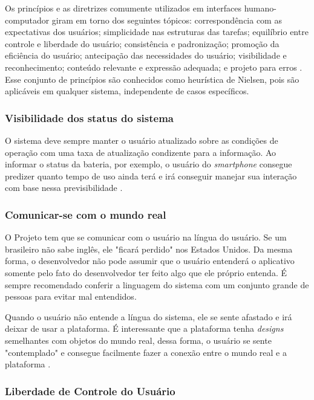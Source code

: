 Os princípios e as diretrizes comumente utilizados em interfaces humano-computador giram em torno dos seguintes tópicos: correspondência com as expectativas dos usuários; simplicidade nas estruturas das tarefas; equilíbrio entre controle e liberdade do usuário; consistência e padronização; promoção da eficiência do usuário; antecipação das necessidades do usuário; visibilidade e reconhecimento; conteúdo relevante e expressão adequada; e projeto para erros \cite{BarbosaEtAl2021InteracaoHumanoComputadorExperiencia}.
Esse conjunto de princípios são conhecidos como heurística de Nielsen, pois são aplicáveis em qualquer sistema, independente de casos específicos.

\subsubsection{Visibilidade dos status do sistema}

O sistema deve sempre manter o usuário atualizado sobre as condições de operação com uma taxa de atualização condizente para a informação. Ao informar o status da bateria, por exemplo, o usuário do \textit{smartphone} consegue predizer quanto tempo de uso ainda terá e irá conseguir manejar sua interação com base nessa previsibilidade \cite{site:nielsen}.

\subsubsection{Comunicar-se com o mundo real}
O Projeto tem que se comunicar com o usuário na língua do usuário. Se um brasileiro não sabe inglês, ele "ficará perdido" nos Estados Unidos. Da mesma forma, o desenvolvedor não pode assumir que o usuário entenderá o aplicativo somente pelo fato do desenvolvedor ter feito algo que ele próprio entenda. É sempre recomendado conferir a linguagem do sistema com um conjunto grande de pessoas para evitar mal entendidos.

Quando o usuário não entende a língua do sistema, ele se sente afastado e irá deixar de usar a plataforma. É interessante que a plataforma tenha \textit{designs} semelhantes com objetos do mundo real, dessa forma, o usuário se sente "contemplado" e consegue facilmente fazer a conexão entre o mundo real e a plataforma \cite{site:nielsenRealWorld}.

\subsubsection{Liberdade de Controle do Usuário}

